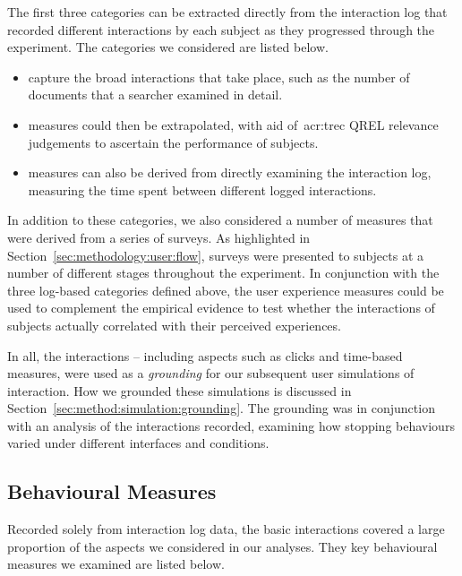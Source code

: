 The first three categories can be extracted directly from the interaction log that recorded different interactions by each subject as they progressed through the experiment. The categories we considered are listed below.

\begin{itemize}
    
    \item{ capture the broad interactions that take place, such as the number of documents that a searcher examined in detail.}
    \item{ measures could then be extrapolated, with aid of~\gls{acr:trec} QREL relevance judgements to ascertain the performance of subjects.}
    \item{ measures can also be derived from directly examining the interaction log, measuring the time spent between different logged interactions.}
    
\end{itemize}

In addition to these categories, we also considered a number of  measures that were derived from a series of surveys. As highlighted in Section~\ref{sec:methodology:user:flow}, surveys were presented to subjects at a number of different stages throughout the experiment. In conjunction with the three log-based categories defined above, the user experience measures could be used to complement the empirical evidence to test whether the interactions of subjects actually correlated with their perceived experiences.

In all, the interactions -- including aspects such as clicks and time-based measures, were used as a \emph{grounding} for our subsequent user simulations of interaction. How we grounded these simulations is discussed in Section~\ref{sec:method:simulation:grounding}. The grounding was in conjunction with an analysis of the interactions recorded, examining how stopping behaviours varied under different interfaces and conditions. 

\vspace*{-3mm}
\subsection{Behavioural Measures}
Recorded solely from interaction log data, the basic interactions covered a large proportion of the aspects we considered in our analyses. They key behavioural measures we examined are listed below.

